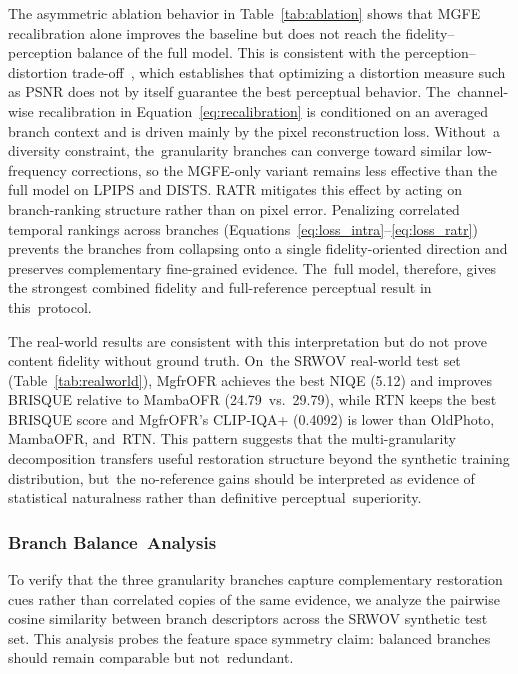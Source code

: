\documentclass[symmetry,article,accept,pdftex,moreauthors]{Definitions/mdpi}
\begin{document}
The asymmetric ablation behavior in Table~\ref{tab:ablation} shows that MGFE recalibration alone improves the baseline but does not reach the fidelity--perception balance of the full model. This is consistent with the perception--distortion trade-off~\cite{blau2018perception}, which establishes that optimizing a distortion measure such as PSNR does not by itself guarantee the best perceptual behavior. The~channel-wise recalibration in Equation~\eqref{eq:recalibration} is conditioned on an averaged branch context and is driven mainly by the pixel reconstruction loss. Without~a diversity constraint, the~granularity branches can converge toward similar low-frequency corrections, so the MGFE-only variant remains less effective than the full model on LPIPS and DISTS. RATR mitigates this effect by acting on branch-ranking structure rather than on pixel error. Penalizing correlated temporal rankings across branches (Equations~\eqref{eq:loss_intra}--\eqref{eq:loss_ratr}) prevents the branches from collapsing onto a single fidelity-oriented direction and preserves complementary fine-grained evidence. The~full model, therefore, gives the strongest combined fidelity and full-reference perceptual result in this~protocol.

The real-world results are consistent with this interpretation but do not prove content fidelity without ground truth. On~the SRWOV real-world test set (Table~\ref{tab:realworld}), MgfrOFR achieves the best NIQE (5.12) and improves BRISQUE relative to MambaOFR (\mbox{24.79 vs.\ 29.79}), while RTN keeps the best BRISQUE score and MgfrOFR's CLIP-IQA+ (0.4092) is lower than OldPhoto, MambaOFR, and~RTN. This pattern suggests that the multi-granularity decomposition transfers useful restoration structure beyond the synthetic training distribution, but~the no-reference gains should be interpreted as evidence of statistical naturalness rather than definitive perceptual~superiority.

\subsubsection{Branch Balance~Analysis}
\label{subsec:branch_analysis}

To verify that the three granularity branches capture complementary restoration cues rather than correlated copies of the same evidence, we analyze the pairwise cosine similarity between branch descriptors across the SRWOV synthetic test set. This analysis probes the feature space symmetry claim: balanced branches should remain comparable but not~redundant.
\end{document}
